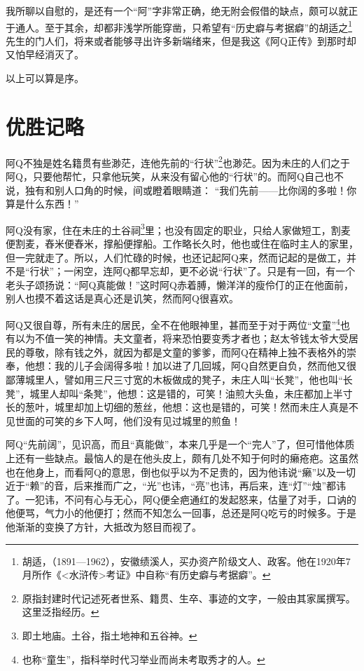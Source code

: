\documentclass[12pt,UTF8]{ctexbook}
\begin{document}
我所聊以自慰的，是还有一个“阿”字非常正确，绝无附会假借的缺点，颇可以就正于通人。至于其余，却都非浅学所能穿凿，只希望有“历史癖与考据癖”的胡适之\footnote{胡适，（1891—1962），安徽绩溪人，买办资产阶级文人、政客。他在1920年7月所作《<水浒传>考证》中自称“有历史癖与考据癖”。}先生的门人们，将来或者能够寻出许多新端绪来，但是我这《阿Q正传》到那时却又怕早经消灭了。

以上可以算是序。

\chapter{优胜记略}

阿Q不独是姓名籍贯有些渺茫，连他先前的“行状”\footnote{原指封建时代记述死者世系、籍贯、生卒、事迹的文字，一般由其家属撰写。这里泛指经历。}也渺茫。因为未庄的人们之于阿Q，只要他帮忙，只拿他玩笑，从来没有留心他的“行状”的。而阿Q自己也不说，独有和别人口角的时候，间或瞪着眼睛道：
“我们先前——比你阔的多啦！你算是什么东西！”

阿Q没有家，住在未庄的土谷祠\footnote{即土地庙。土谷，指土地神和五谷神。}里；也没有固定的职业，只给人家做短工，割麦便割麦，舂米便舂米，撑船便撑船。工作略长久时，他也或住在临时主人的家里，但一完就走了。所以，人们忙碌的时候，也还记起阿Q来，然而记起的是做工，并不是“行状”；一闲空，连阿Q都早忘却，更不必说“行状”了。只是有一回，有一个老头子颂扬说：“阿Q真能做！”这时阿Q赤着膊，懒洋洋的瘦伶仃的正在他面前，别人也摸不着这话是真心还是讥笑，然而阿Q很喜欢。

阿Q又很自尊，所有未庄的居民，全不在他眼神里，甚而至于对于两位“文童”\footnote{也称“童生”，指科举时代习举业而尚未考取秀才的人。}也有以为不值一笑的神情。夫文童者，将来恐怕要变秀才者也；赵太爷钱太爷大受居民的尊敬，除有钱之外，就因为都是文童的爹爹，而阿Q在精神上独不表格外的崇奉，他想：我的儿子会阔得多啦！加以进了几回城，阿Q自然更自负，然而他又很鄙薄城里人，譬如用三尺三寸宽的木板做成的凳子，未庄人叫“长凳”，他也叫“长凳”，城里人却叫“条凳”，他想：这是错的，可笑！油煎大头鱼，未庄都加上半寸长的葱叶，城里却加上切细的葱丝，他想：这也是错的，可笑！然而未庄人真是不见世面的可笑的乡下人呵，他们没有见过城里的煎鱼！

阿Q“先前阔”，见识高，而且“真能做”，本来几乎是一个“完人”了，但可惜他体质上还有一些缺点。最恼人的是在他头皮上，颇有几处不知于何时的癞疮疤。这虽然也在他身上，而看阿Q的意思，倒也似乎以为不足贵的，因为他讳说“癞”以及一切近于“赖”的音，后来推而广之，“光”也讳，“亮”也讳，再后来，连“灯”“烛”都讳了。一犯讳，不问有心与无心，阿Q便全疤通红的发起怒来，估量了对手，口讷的他便骂，气力小的他便打；然而不知怎么一回事，总还是阿Q吃亏的时候多。于是他渐渐的变换了方针，大抵改为怒目而视了。
\end{document}
